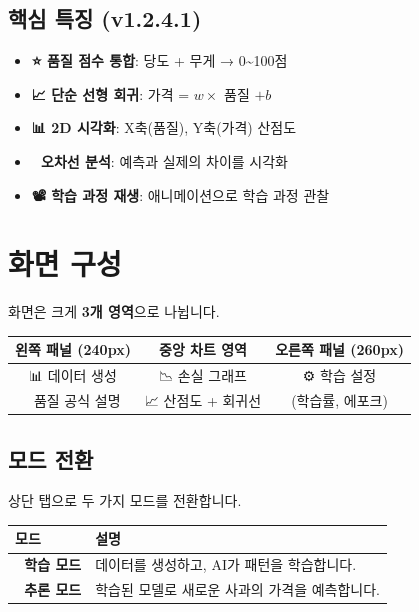\documentclass[11pt,a4paper]{article}
\begin{document}
\subsection{핵심 특징 (v1.2.4.1)}

\begin{itemize}[leftmargin=*]
    \item \textbf{⭐ 품질 점수 통합}: 당도 + 무게 → 0\textasciitilde100점
    \item \textbf{📈 단순 선형 회귀}: 가격 = $w \times$ 품질 $+ b$
    \item \textbf{📊 2D 시각화}: X축(품질), Y축(가격) 산점도
    \item \textbf{📏 오차선 분석}: 예측과 실제의 차이를 시각화
    \item \textbf{📽️ 학습 과정 재생}: 애니메이션으로 학습 과정 관찰
\end{itemize}

\section{화면 구성}

화면은 크게 \textbf{3개 영역}으로 나뉩니다.

\begin{center}
\begin{tabular}{|c|c|c|}
\hline
\rowcolor{bgblue}
\textbf{왼쪽 패널 (240px)} & \textbf{중앙 차트 영역} & \textbf{오른쪽 패널 (260px)} \\
\hline
📊 데이터 생성 & 📉 손실 그래프 & ⚙️ 학습 설정 \\
📐 품질 공식 설명 & 📈 산점도 + 회귀선 & (학습률, 에포크) \\
\hline
\end{tabular}
\end{center}

\subsection{모드 전환}

상단 탭으로 두 가지 모드를 전환합니다.

\begin{center}
\begin{tabular}{|l|p{8cm}|}
\hline
\rowcolor{bggreen}
\textbf{모드} & \textbf{설명} \\
\hline
\textbf{🧠 학습 모드} & 데이터를 생성하고, AI가 패턴을 학습합니다. \\
\hline
\textbf{🔮 추론 모드} & 학습된 모델로 새로운 사과의 가격을 예측합니다. \\
\hline
\end{tabular}
\end{center}
\end{document}

